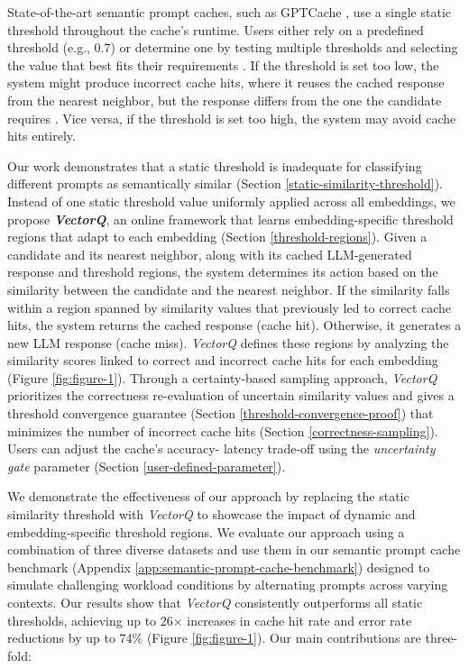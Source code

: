 State-of-the-art semantic prompt caches, such as GPTCache \cite{bang2023gptcache}, use a single static threshold throughout the cache's runtime. Users either rely on a predefined threshold (e.g., 0.7) or determine one by testing multiple thresholds and selecting the value that best fits their requirements \cite{dasgupta2025wallmartcache}. If the threshold is set too low, the system might produce incorrect cache hits, where it reuses the cached response from the nearest neighbor, but the response differs from the one the candidate requires \cite{rekabsaz2017exploration}. Vice versa, if the threshold is set too high, the system may avoid cache hits entirely.

Our work demonstrates that a static threshold is inadequate for classifying different prompts as semantically similar (Section \ref{static-similarity-threshold}). Instead of one static threshold value uniformly applied across all embeddings, we propose \textbf{\textit{VectorQ}}, an online framework that learns embedding-specific threshold regions that adapt to each embedding (Section \ref{threshold-regions}). Given a candidate and its nearest neighbor, along with its cached LLM-generated response and threshold regions, the system determines its action based on the similarity between the candidate and the nearest neighbor. If the similarity falls within a region spanned by similarity values that previously led to correct cache hits, the system returns the cached response (cache hit). Otherwise, it generates a new LLM response (cache miss). \textit{VectorQ} defines these regions by analyzing the similarity scores linked to correct and incorrect cache hits for each embedding (Figure \ref{fig:figure-1}). Through a certainty-based sampling approach, \textit{VectorQ} prioritizes the correctness re-evaluation of uncertain similarity values and gives a threshold convergence guarantee (Section \ref{threshold-convergence-proof}) that minimizes the number of incorrect cache hits (Section \ref{correctness-sampling}). Users can adjust the cache's accuracy- latency trade-off using the \textit{uncertainty gate} parameter (Section \ref{user-defined-parameter}).

We demonstrate the effectiveness of our approach by replacing the static similarity threshold with \textit{VectorQ} to showcase the impact of dynamic and embedding-specific threshold regions. We evaluate our approach using a combination of three diverse datasets \cite{saurabh-2023, talmor2018commonsenseqa, ni2019justifying} and use them in our semantic prompt cache benchmark (Appendix \ref{app:semantic-prompt-cache-benchmark}) designed to simulate challenging workload conditions by alternating prompts across varying contexts. Our results show that \textit{VectorQ} consistently outperforms all static thresholds, achieving up to 26× increases in cache hit rate and error rate reductions by up to 74\% (Figure \ref{fig:figure-1}). Our main contributions are three-fold:

